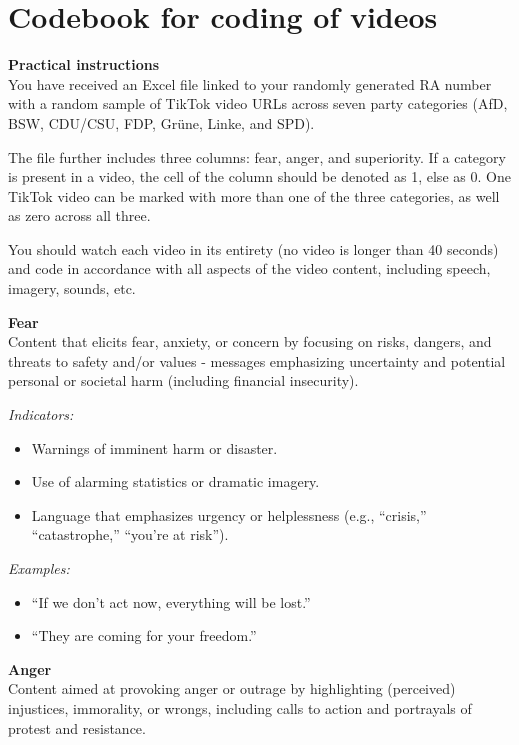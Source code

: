 \documentclass[12pt]{article}
\begin{document}
\clearpage




\section{Codebook for coding of videos}\label{appendix:codebook}

\textbf{Practical instructions} \\
You have received an Excel file linked to your randomly generated RA number with a random sample of TikTok video URLs across seven party categories (AfD, BSW, CDU/CSU, FDP, Grüne, Linke, and SPD).

The file further includes three columns: fear, anger, and superiority. If a category is present in a video, the cell of the column should be denoted as 1, else as 0. One TikTok video can be marked with more than one of the three categories, as well as zero across all three.

You should watch each video in its entirety (no video is longer than 40 seconds) and code in accordance with all aspects of the video content, including speech, imagery, sounds, etc.


\textbf{Fear} \\
Content that elicits fear, anxiety, or concern by focusing on risks, dangers, and threats to safety and/or values - messages emphasizing uncertainty and potential personal or societal harm (including financial insecurity).

\textit{Indicators:}
\begin{itemize}
    \item Warnings of imminent harm or disaster.
    \item Use of alarming statistics or dramatic imagery.
    \item Language that emphasizes urgency or helplessness (e.g., ``crisis,'' ``catastrophe,'' ``you're at risk'').
\end{itemize}

\textit{Examples:}
\begin{itemize}
    \item ``If we don't act now, everything will be lost.''
    \item ``They are coming for your freedom.''
\end{itemize}



\textbf{Anger}\\
Content aimed at provoking anger or outrage by highlighting (perceived) injustices, immorality, or wrongs, including calls to action and portrayals of protest and resistance.
\end{document}
